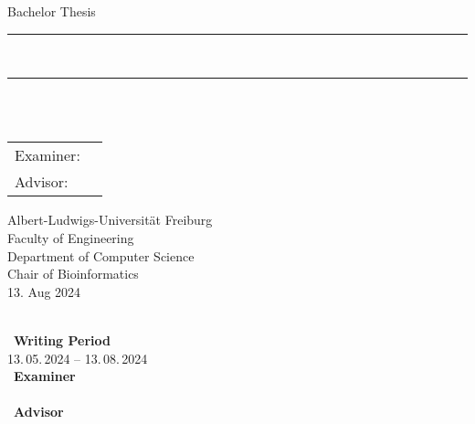 \begin{titlepage}
	\begin{center}

		\newcommand{\HorizontalLine}{\rule{\linewidth}{0.3mm}}

		{\Large Bachelor Thesis}\\[1.3cm]


		\HorizontalLine \\[0.4cm]
		{ \huge \bfseries \thetitle }
		\HorizontalLine \\[2cm]


		{\Huge \theauthor} \\[2.1cm]


		\begin{tabular}[hc]{>{\huge}l >{\huge}l}
			Examiner: & \firstexaminer \\[0.3cm]
			Advisor:  & \advisers      \\[2.6cm]
		\end{tabular}
		\vfill  %

		\Large {
			Albert-Ludwigs-Universität Freiburg\\
			Faculty of Engineering\\
            Department of Computer Science\\
			Chair of Bioinformatics\\[0.7cm]

			13. Aug 2024
			\\
		}
	\end{center}
\end{titlepage}

\thispagestyle{empty}
\ \vfill \ \\  %
\
\textbf{Writing Period}            \smallskip{} \\
13.\,05.\,2024 -- 13.\,08.\,2024   	 \bigskip{} \\
\
\textbf{Examiner}                  \smallskip{} \\
\firstexaminer                      \bigskip{} \\
\
\textbf{Advisor}                  \smallskip{} \\
\advisers